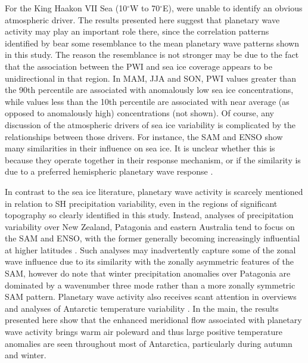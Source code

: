 For the King Haakon VII Sea (10$^{\circ}$W to 70$^{\circ}$E), \citet{Raphael2014} were unable to identify an obvious atmospheric driver. The results presented here suggest that planetary wave activity may play an important role there, since the correlation patterns identified by \citet{Raphael2014} bear some resemblance to the mean planetary wave patterns shown in this study. The reason the resemblance is not stronger may be due to the fact that the association between the PWI and sea ice coverage appears to be unidirectional in that region. In MAM, JJA and SON, PWI values greater than the 90th percentile are associated with anomalously low sea ice concentrations, while values less than the 10th percentile are associated with near average (as opposed to anomalously high) concentrations (not shown). Of course, any discussion of the atmospheric drivers of sea ice variability is complicated by the relationships between those drivers. For instance, the SAM and ENSO show many similarities in their influence on sea ice. It is unclear whether this is because they operate together in their response mechanism, or if the similarity is due to a preferred hemispheric planetary wave response \citep[e.g.][]{Pezza2012}. 

In contrast to the sea ice literature, planetary wave activity is scarcely mentioned in relation to SH precipitation variability, even in the regions of significant topography so clearly identified in this study. Instead, analyses of precipitation variability over New Zealand, Patagonia and eastern Australia tend to focus on the SAM and ENSO, with the former generally becoming increasingly influential at higher latitudes \citep[e.g.][]{Ummenhofer2007,Aravena2009,Kidston2009,Risbey2009,Garreaud2013,Jiang2013}. Such analyses may inadvertently capture some of the zonal wave influence due to its similarity with the zonally asymmetric features of the SAM, however \citet{Garreaud2013} do note that winter precipitation anomalies over Patagonia are dominated by a wavenumber three mode rather than a more zonally symmetric SAM pattern. Planetary wave activity also receives scant attention in overviews and analyses of Antarctic temperature variability \citep[e.g.][]{Russell2010,SchneiderOkumura2012,Yu2012}. In the main, the results presented here show that the enhanced meridional flow associated with planetary wave activity brings warm air poleward and thus large positive temperature anomalies are seen throughout most of Antarctica, particularly during autumn and winter. 
